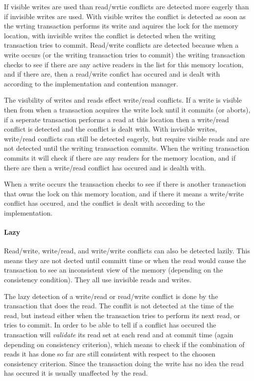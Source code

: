 If visible writes are used than read/wrtie conflicts are detected more eagerly than if invisible writes are used.
With visible writes the conflict is detected as soon as the wrting transaction
 performs its write and aquires the lock for the memory location, with invisible
 writes the conflict is detected when the writing transaction tries to commit.
Read/write conflicts are detected because when a write occurs (or the writing
 transaction tries to commit) the writing transaction checks to see if there are
 any active readers in the list for this memory location, and if there are, then
 a read/write confict has occured and is dealt with according to the implementation and contention manager.

The visibility of writes and reads effect write/read conflicts.
If a write is visible then from when a transaction acquires the write lock until
 it commits (or aborts), if a seperate transaction performs a read at this location
 then a write/read conflict is detected and the conflict is dealt with.
With invisible writes, write/read conflicts can still be detected eagerly,
 but require visible reads and are not detected until the writing transaction commits.
When the writing transaction commits it will check if there are any 
readers for the memory location, and if there are then a write/read conflict has occured and is dealth with.

When a write occurs the transaction checks to see if there is another 
transaction that owns the lock on this memory location, and if there it
 means a write/write conflict has occured, and the conflict is dealt with according to the implementation.

\paragraph{Lazy}
Read/write, write/read, and write/write conflicts can also be detected lazily.
This means they are not dected until committ time or when the read would
 cause the transaction to see an inconsistent view of the memory (depending on the consistency condition).
They all use invisible reads and writes.

The lazy detection of a write/read or read/write conflict is done by the transaction that does the read.
The conflit is not detected at the time of the read, but instead either
 when the transaction tries to perform its next read, or tries to commit.
In order to be able to tell if a conflict has occured the transaction
 will \emph{validate} its read set at each read and at commit time 
(again depending on consistency criterion), which means to check 
if the combination of reads it has done so far are still consistent with
 respect to the choosen consistency criterion.
Since the transaction doing the write has no idea the read has occured 
it is usually unaffected by the read.

